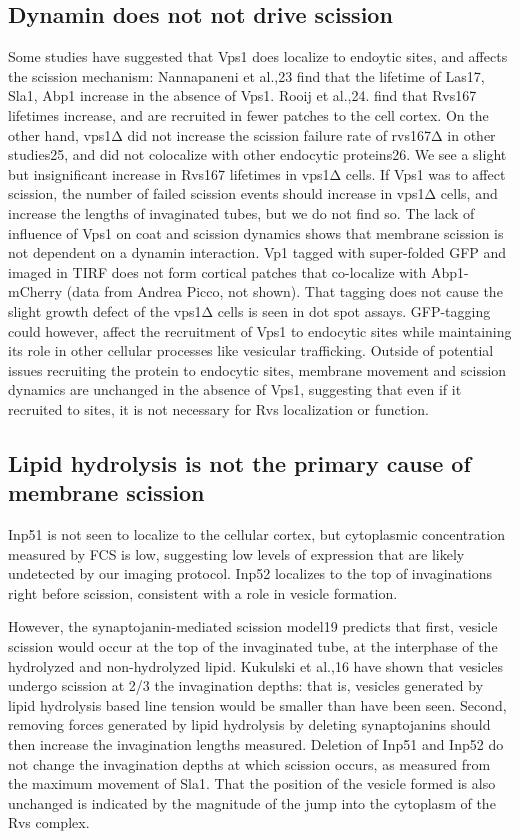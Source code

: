\subsection{Dynamin does not not drive scission}
Some studies have suggested that Vps1 does localize to endoytic sites, and affects the scission mechanism: Nannapaneni et al.,23 find that the lifetime of Las17, Sla1, Abp1 increase in the absence of Vps1. Rooij et al.,24. find that Rvs167 lifetimes increase, and are recruited in fewer patches to the cell cortex. On the other hand, vps1Δ did not increase the scission failure rate of rvs167Δ in other studies25, and did not colocalize with other endocytic proteins26. We see a slight but insignificant increase in Rvs167 lifetimes in vps1Δ cells. If Vps1 was to affect scission, the number of failed scission events should increase in vps1Δ cells, and increase the lengths of invaginated tubes, but we do not find so. The lack of influence of Vps1 on coat and scission dynamics shows that membrane scission is not dependent on a dynamin interaction. Vp1 tagged with super-folded GFP and imaged in TIRF does not form cortical patches that co-localize with Abp1-mCherry (data from Andrea Picco, not shown). That tagging does not cause the slight growth defect of the vps1Δ cells is seen in dot spot assays. GFP-tagging could however, affect the recruitment of Vps1 to endocytic sites while maintaining its role in other cellular processes like vesicular trafficking. Outside of potential issues recruiting the protein to endocytic sites, membrane movement and scission dynamics are unchanged in the absence of Vps1, suggesting that even if it recruited to sites, it is not necessary for Rvs localization or function. 


\subsection{Lipid hydrolysis is not the primary cause of membrane scission}
Inp51 is not seen to localize to the cellular cortex, but cytoplasmic concentration measured by FCS is low, suggesting low levels of expression that are likely undetected by our imaging protocol. Inp52 localizes to the top of invaginations right before scission, consistent with a role in vesicle formation. 

	\vspace{5mm}
However, the synaptojanin-mediated scission model19 predicts that first, vesicle scission would occur at the top of the invaginated tube, at the interphase of the hydrolyzed and non-hydrolyzed lipid. Kukulski et al.,16 have shown that vesicles undergo scission at 2/3 the invagination depths: that is, vesicles generated by lipid hydrolysis based line tension would be smaller than have been seen. Second, removing forces generated by lipid hydrolysis by deleting synaptojanins should then increase the invagination lengths measured. Deletion of Inp51 and Inp52 do not change the invagination depths at which scission occurs, as measured from the maximum movement of Sla1. That the position of the vesicle formed is also unchanged is indicated by the magnitude of the jump into the cytoplasm of the Rvs complex. 

